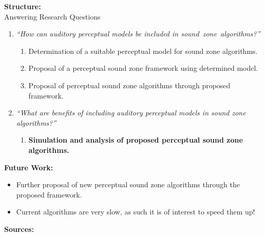 \documentclass[aspectratio=169]{beamer}
\begin{document}
\begin{frame}{\textbf{Structure:}\\ Answering Research Questions}
    \begin{enumerate}
        \item {\textit{``How can auditory perceptual models be included in sound~zone~algorithms?''}}
            \vspace{7pt}
            \begin{enumerate}
                \item Determination of a suitable perceptual model for sound zone algorithms.
                \vspace{7pt}
                \item Proposal of a perceptual sound zone framework using determined model. 
                \vspace{7pt}
                \item Proposal of perceptual sound zone algorithms through proposed framework.
                \vspace{7pt}
            \end{enumerate}
        \item {\textit{``What are benefits of including auditory perceptual models in sound zone algorithms?''}}
            \vspace{-5pt}
            \begin{enumerate}
                \item \textbf{Simulation and analysis of proposed perceptual sound zone algorithms.}
            \end{enumerate}
    \end{enumerate}
\end{frame}

\begin{frame}{\textbf{Future Work:}}
    \begin{itemize}
        \item Further proposal of new perceptual sound zone algorithms through the proposed framework.
        \item Current algorithms are very slow, as such it is of interest to speed them up!
    \end{itemize}
\end{frame}

\begin{frame}{\textbf{Sources:}}
    \begin{columns}[c]
        \printbibliography
    \end{columns}
\end{frame}
\end{document}
